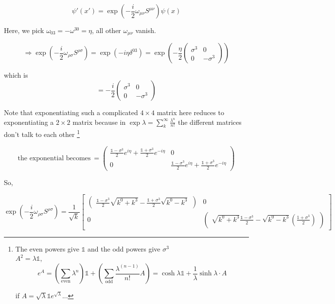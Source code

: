\documentclass[11pt]{article}
\begin{document}
		\[ \psi'(x') = \exp(-\frac{i}{2} 
		\omega_{\mu\nu} S^{\mu\nu})\psi(x)\]
	
	
	Here, we pick $\omega_{03} = -\omega^{30} = \eta$, all other $\omega_{\mu\nu}$ vanish.
	
	\[ \Rightarrow \exp \left(-\frac{i}{2} \omega_{\rho\sigma} S^{\rho \sigma}\right) = \exp(-i\eta\delta^{03}) = \exp\left(-\frac{\eta}{2}\begin{pmatrix}
		\sigma^3 & 0\\ 0 & -\sigma^3
	\end{pmatrix}\right)\]

which is $$ = -\frac{i}{2}\begin{pmatrix}
	\sigma^3 & 0 \\ 0 & - \sigma^3
\end{pmatrix}$$

Note that exponentiating such a complicated $4\times 4$ matrix here reduces to exponentiating a $2\times2$ matrix because in $\exp \lambda = \sum_k^\infty \frac{\lambda^n}{
n!}$ the different matrices don't talk to each other \footnote{
	The even powers give $\mathbb{1}$ and the odd powers give $\sigma^3$\\

 $A^2 = \lambda\mathbb{1}$, $$e^{A} = \left( \sum_{\text{even}} \lambda^{n} \right) \mathbb{1} + \left(\sum_{\text{odd}} \frac{\lambda^{(n-1)}}{n!}A \right)= \cosh \lambda \mathbb{1} + \frac{1}{\lambda}\sinh \lambda \cdot A$$

if $A = \sqrt{\lambda} \mathbb{1} e^{\sqrt{\lambda}}$...

	}
	
	\[ \text{the exponential becomes}\ = \begin{pmatrix} \frac{\mathbb{1}-\sigma^3}{2}e^{i\eta}  + \frac{\mathbb{1}+\sigma^3}{2}e^{-i\eta}  & 0 \\
		 0 &  \frac{\mathbb{1}-\sigma^3}{2}e^{i\eta} +  \frac{\mathbb{1}+\sigma^3}{2}e^{-i\eta} \end{pmatrix}\]
	
	
	So, 
	
	\[ \exp\left(-\frac{i}{2} \omega_{\rho\sigma} S^{\rho\sigma} \right) 
		= 	\frac{1}{\sqrt{k}}
	\begin{bmatrix}
		 \begin{pmatrix}
			\frac{\mathbb{1}-\sigma^3}{2}\sqrt{k^0 + k^3}  - \frac{\mathbb{1}+\sigma^3}{2}\sqrt{k^0 - k^3} 
		\end{pmatrix} & 0 \\
		
		0 & \begin{pmatrix}
			\sqrt{k^0 + k^3} \frac{\mathbb{1} - \sigma^3}{2} - \sqrt{k^0 - k^3}\left(\frac{1 + \sigma^3}{2}\right)
		\end{pmatrix}
	\end{bmatrix}
	\]
	
\end{document}
